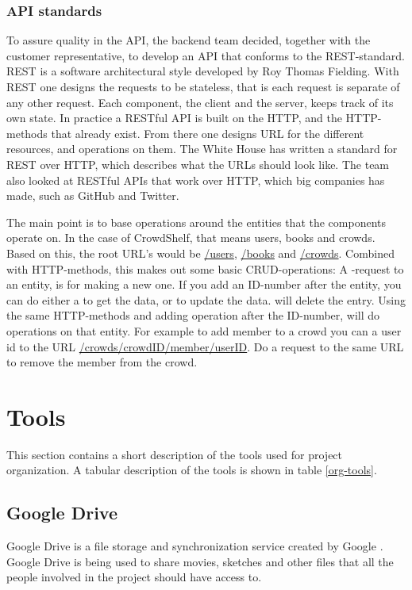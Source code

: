 \subsubsection{\gls{API} standards}
To assure quality in the \gls{API}, the backend team decided, together with the customer representative, to develop an \gls{API} that conforms to the \gls{REST}-standard. \gls{REST} is a software architectural style developed by Roy Thomas Fielding.\cite[chap. 5]{fielding2000} With REST one designs the requests to be stateless, that is each request is separate of any other request. Each component, the client and the server, keeps track of its own state. In practice a RESTful API is built on the \gls{HTTP}, and the \gls{HTTP}-methods that already exist. From there one designs \gls{URL} for the different resources, and operations on them.\cite{rest-web-services} The White House has written a standard for REST over \gls{HTTP}, which describes what the URLs should look like.\cite{whitehouse-api-standard} The team also looked at RESTful APIs that work over HTTP, which big companies has made, such as GitHub and Twitter.\cite{github-api}\cite{twitter-api}

The main point is to base operations around the entities that the components operate on. In the case of CrowdShelf, that means users, books and crowds. Based on this, the root URL's would be \url{/users}, \url{/books} and \url{/crowds}. Combined with \gls{HTTP}-methods, this makes out some basic \gls{CRUD}-operations: A -request to an entity, is for making a new one.\cite{http-method-spec} If you add an \gls{ID}-number after the entity, you can do either a  to get the data, or  to update the data.  will delete the entry. Using the same HTTP-methods and adding operation after the \gls{ID}-number, will do operations on that entity. For example to add member to a crowd you can  a user id to the URL \url{/crowds/crowdID/member/userID}. Do a  request to the same URL to remove the member from the crowd.


\section{Tools}
This section contains a short description of the tools used for project organization. A tabular description of the tools is shown in table \ref{org-tools}.

    \subsection{Google Drive}
    Google Drive is a file storage and synchronization service created by Google \cite{google-drive}. 
    Google Drive is being used to share movies, sketches and other files that all the people involved in the project should have access to.
